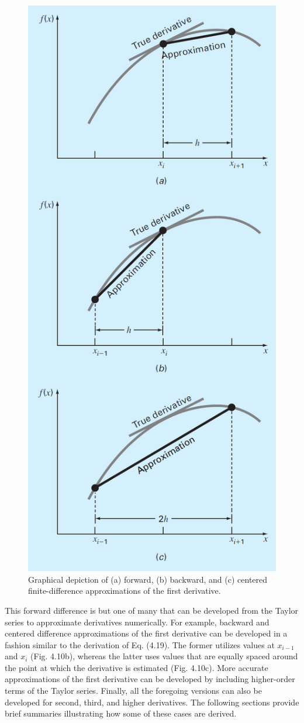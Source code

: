 \documentclass[../main.tex]{subfiles}
\begin{document}
\begin{figure}[h]
    \includegraphics[width=0.5\linewidth]{./images/fig_4_10}
    \caption{Graphical depiction of (a) forward, (b) backward, and (c) centered finite-difference
    approximations of the first derivative.}
\end{figure}

This forward difference is but one of many that can be developed from the Taylor
series to approximate derivatives numerically. For example, backward and centered difference
approximations of the first derivative can be developed in a fashion similar to the
derivation of Eq. (4.19). The former utilizes values at $x_{i-1}$ and $x_i$ (Fig. 4.10b), whereas
the latter uses values that are equally spaced around the point at which the derivative is
estimated (Fig. 4.10c). More accurate approximations of the first derivative can be developed
by including higher-order terms of the Taylor series. Finally, all the foregoing versions
can also be developed for second, third, and higher derivatives. The following sections provide
brief summaries illustrating how some of these cases are derived.\\
\end{document}
